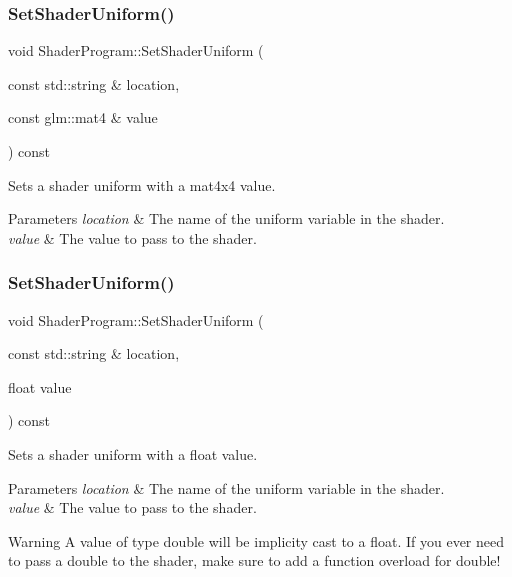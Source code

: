 \subsubsection{\texorpdfstring{Set\+Shader\+Uniform()}{SetShaderUniform()}\hspace{0.1cm}{\footnotesize\ttfamily [1/4]}}
{\footnotesize\ttfamily void Shader\+Program\+::\+Set\+Shader\+Uniform (\begin{DoxyParamCaption}\item[{const std\+::string \&}]{location,  }\item[{const glm\+::mat4 \&}]{value }\end{DoxyParamCaption}) const}



Sets a shader uniform with a mat4x4 value.


\begin{DoxyParams}{Parameters}
{\em location} & The name of the uniform variable in the shader. \\
\hline
{\em value} & The value to pass to the shader. \\
\hline
\end{DoxyParams}
\hypertarget{class_shader_program_a7ffbc023f4bb3ae2c8b458eb7182dff0}{}\label{class_shader_program_a7ffbc023f4bb3ae2c8b458eb7182dff0}
\subsubsection{\texorpdfstring{Set\+Shader\+Uniform()}{SetShaderUniform()}\hspace{0.1cm}{\footnotesize\ttfamily [2/4]}}
{\footnotesize\ttfamily void Shader\+Program\+::\+Set\+Shader\+Uniform (\begin{DoxyParamCaption}\item[{const std\+::string \&}]{location,  }\item[{float}]{value }\end{DoxyParamCaption}) const}



Sets a shader uniform with a float value.


\begin{DoxyParams}{Parameters}
{\em location} & The name of the uniform variable in the shader. \\
\hline
{\em value} & The value to pass to the shader. \\
\hline
\end{DoxyParams}
\begin{DoxyWarning}{Warning}
A value of type double will be implicity cast to a float. If you ever need to pass a double to the shader, make sure to add a function overload for double!
\end{DoxyWarning}
\hypertarget{class_shader_program_a16164eb7e3f1e2ca9bf60c492e43b4df}{}\label{class_shader_program_a16164eb7e3f1e2ca9bf60c492e43b4df}
